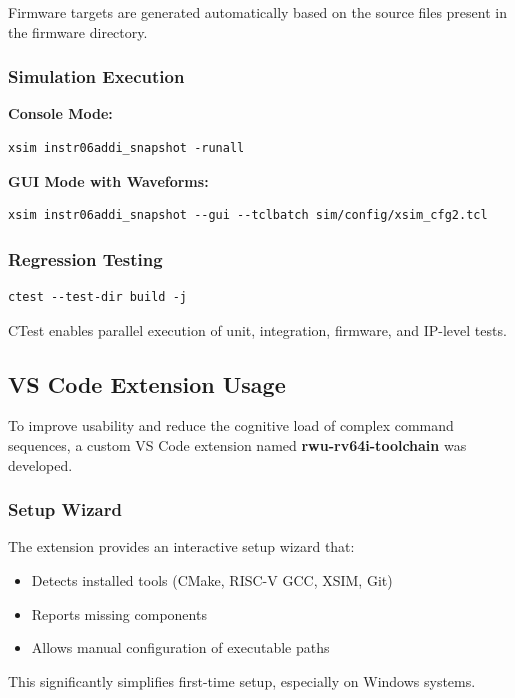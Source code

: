 Firmware targets are generated automatically based on the source files present in the firmware directory.

\subsubsection{Simulation Execution}

\textbf{Console Mode:}
\begin{verbatim}
xsim instr06addi_snapshot -runall
\end{verbatim}

\textbf{GUI Mode with Waveforms:}
\begin{verbatim}
xsim instr06addi_snapshot --gui --tclbatch sim/config/xsim_cfg2.tcl
\end{verbatim}

\subsubsection{Regression Testing}

\begin{verbatim}
ctest --test-dir build -j
\end{verbatim}

CTest enables parallel execution of unit, integration, firmware, and IP-level tests.

\subsection{VS Code Extension Usage}

To improve usability and reduce the cognitive load of complex command sequences, a custom VS Code extension named \textbf{rwu-rv64i-toolchain} was developed.

\subsubsection{Setup Wizard}

The extension provides an interactive setup wizard that:
\begin{itemize}
    \item Detects installed tools (CMake, RISC-V GCC, XSIM, Git)
    \item Reports missing components
    \item Allows manual configuration of executable paths
\end{itemize}

This significantly simplifies first-time setup, especially on Windows systems.

